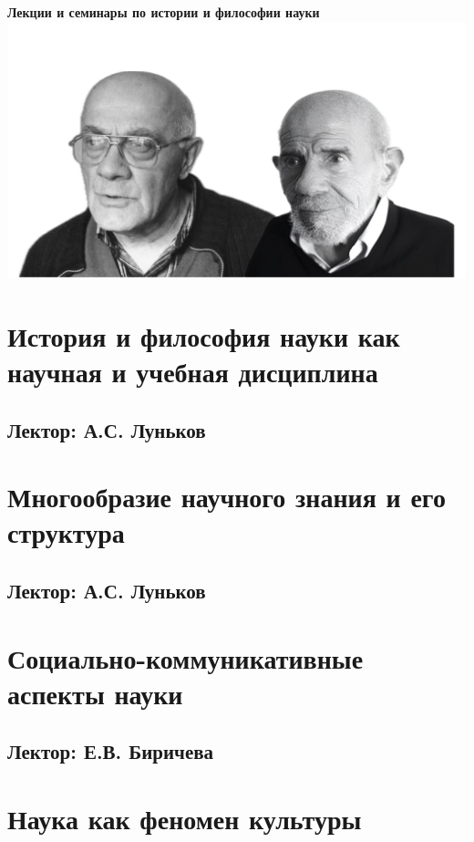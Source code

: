 \documentclass[a4paper, 12pt, notitlepage]{report}
\begin{document}
\begin{titlepage}
    \centering
    \vspace*{9cm}
    {\Huge \textbf{Лекции и семинары по истории и философии науки}}
    \includegraphics[width=\textwidth,trim=4 4 4 4,clip]{pictures/title.png}
    \vfill
\end{titlepage}

\tableofcontents

\chapter{История и философия науки как научная и учебная дисциплина}
\section*{Лектор: А.С. Луньков} 


\chapter{Многообразие научного знания и его структура}
\section*{Лектор: А.С. Луньков} 


\chapter{Социально-коммуникативные аспекты науки}
\section*{Лектор: Е.В. Биричева} 


\chapter{Наука как феномен культуры}
\end{document}
